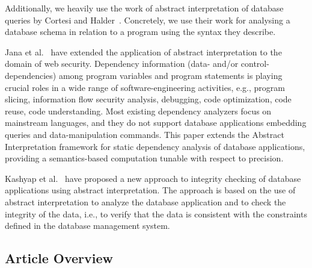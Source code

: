 Additionally, we heavily use the work of abstract interpretation of database queries by Cortesi and Halder~\cite{halder_abstract_2012}.
Concretely, we use their work for analysing a database schema in relation to a program using the syntax they describe.


Jana et al.~\cite{jana_extending_2020} have extended the application of abstract interpretation to the domain of web security.
Dependency information (data- and/or control-dependencies) among program variables and program statements is playing crucial roles in a wide range of software-engineering activities, e.g., program slicing, information flow security analysis, debugging, code optimization, code reuse, code understanding.
Most existing dependency analyzers focus on mainstream languages, and they do not support database applications embedding queries and data-manipulation commands.
This paper extends the Abstract Interpretation framework for static dependency analysis of database applications, providing a semantics-based computation tunable with respect to precision.

Kashyap et al.~\cite{kashyap_integrity_2022} have proposed a new approach to integrity checking of database applications using abstract interpretation.
The approach is based on the use of abstract interpretation to analyze the database application and to check the integrity of the data, i.e., to verify that the data is consistent with the constraints defined in the database management system.


\subsection{Article Overview}\label{subsec:article-overview}

